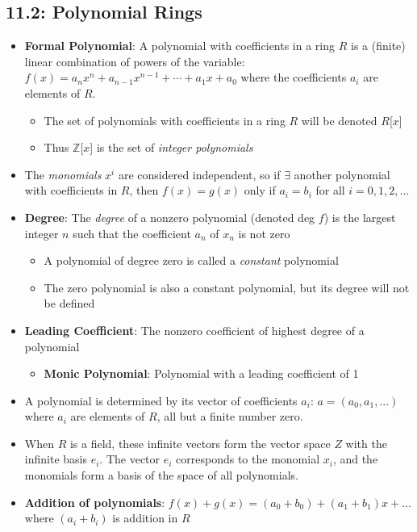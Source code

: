 \documentclass[12pt]{article}
\begin{document}
\subsection*{11.2: Polynomial Rings}
\begin{itemize}
  \item \textbf{Formal Polynomial}: A polynomial with coefficients in a ring $R$ is a (finite) linear combination of powers of the variable: $f(x) = a_nx^n + a_{n-1}x^{n-1} + \cdots + a_1x + a_0$ where the coefficients $a_i$ are elements of $R$.
  \begin{itemize}
    \item The set of polynomials with coefficients in a ring $R$ will be denoted $R$[$x$]
    \item Thus $\mathbb{Z}$[$x$] is the set of \textit{integer polynomials}
  \end{itemize}
  \item The \textit{monomials} $x^i$ are considered independent, so if $\exists$ another polynomial with coefficients in $R$, then $f(x) = g(x)$ only if $a_i = b_i$ for all $i = 0, 1, 2, ...$
  \item \textbf{Degree}: The \textit{degree} of a nonzero polynomial (denoted deg $f$) is the largest integer $n$ such that the coefficient $a_n$ of $x_n$ is not zero
  \begin{itemize}
    \item A polynomial of degree zero is called a \textit{constant} polynomial
    \item The zero polynomial is also a constant polynomial, but its degree will not be defined
  \end{itemize}
  \item \textbf{Leading Coefficient}: The nonzero coefficient of highest degree of a polynomial
  \begin{itemize}
    \item \textbf{Monic Polynomial}: Polynomial with a leading coefficient of 1
  \end{itemize}
  \item A polynomial is determined by its vector of coefficients $a_i$: $a = (a_0, a_1, ...)$ where $a_i$ are elements of $R$, all but a finite number zero.
  \item When $R$ is a field, these infinite vectors form the vector space $Z$ with the infinite basis $e_i$. The vector $e_i$ corresponds to the monomial $x_i$, and the monomials form a basis of the space of all polynomials.
  \item \textbf{Addition of polynomials}: $f(x) + g(x) = (a_0 + b_0) + (a_1 + b_1)x + ...$ where $(a_i + b_i)$ is addition in $R$

\end{itemize}
\end{document}
